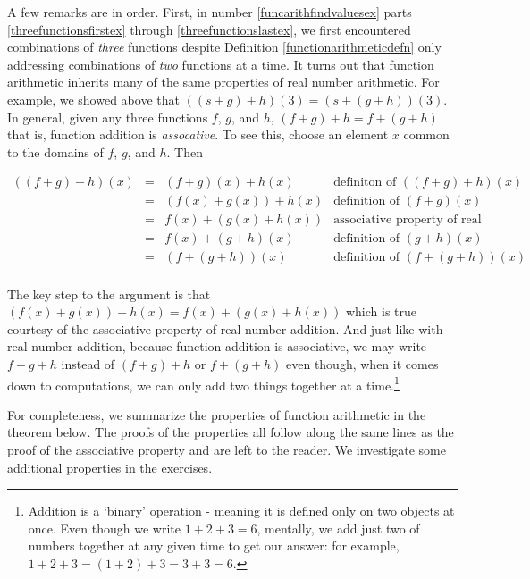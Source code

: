\documentclass{ximera}
\begin{document}
 A few remarks are in order.  First, in number \ref{funcarithfindvaluesex} parts \ref{threefunctionsfirstex} through \ref{threefunctionslastex}, we first encountered combinations of \textit{three} functions despite Definition \ref{functionarithmeticdefn} only addressing combinations of \textit{two} functions at a time.  It turns out that function arithmetic inherits many of the same properties of real number arithmetic. For example, we showed above that  $((s+g)+h)(3) = (s+(g+h))(3)$.  In general, given any three functions $f$, $g$, and $h$, $(f+g)+h = f +(g+h)$ that is, function addition is \textit{assocative}.  To see this, choose an element $x$ common to the domains of $f$, $g$, and $h$.  Then 
 
 \[ \begin{array}{rclr}
 
((f+g)+h)(x) & = & (f+g)(x)+h(x) & \text{definiton of $((f+g)+h)(x)$} \\

                    & = & (f(x)+g(x))+h(x) & \text{definition of $(f+g)(x)$} \\
                    & = & f(x) + (g(x)+h(x)) & \text{associative property of real number addition} \\
                    & = & f(x) + (g+h)(x) & \text{definition of $(g+h)(x)$} \\
                    & = & (f+(g+h))(x) & \text{definition of $(f+(g+h))(x)$} \\  \end{array} \]

The key step  to the argument is that  $(f(x)+g(x))+h(x)   =  f(x) + (g(x)+h(x))$ which is true courtesy of the associative property of real number addition.  And just like with real number addition, because function addition is associative, we may write $f+g+h$ instead of $(f+g)+h$ or $f+(g+h)$ even though, when it comes down to computations, we can only add two things together at a time.\footnote{Addition is a `binary' operation - meaning it is defined only on two objects at once.  Even though we write $1+2+3 = 6$,  mentally, we add just two of  numbers together at any given time to get our answer: for example, $1+2+3 = (1+2)+3 = 3+3 = 6$.}

For completeness, we summarize the properties of function arithmetic in the theorem below.  The proofs of the properties all follow along the same lines as the proof of the associative property and are left to the reader.  We investigate some additional properties in the exercises.
\end{document}

